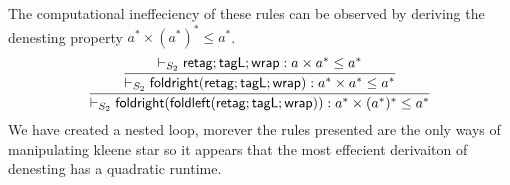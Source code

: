 \documentclass[a4paper,UKenglish,cleveref, autoref, thm-restate]{lipics-v2021}
\begin{document}
\begin{example}[Kozen]
The computational ineffeciency of these rules can be observed by deriving the denesting property $a ^* \times (a^*)^* \leq a^*$. 
\[\infer{\containsP{}{\dslcom{foldright}(\dslcom{foldleft}(\dslcom{retag};\dslcom{tagL};\dslcom{wrap}))}{a^* \times (a^*)^*}{a^*}{S_2}}{\infer{\containsP{}{\dslcom{foldright}(\dslcom{retag};\dslcom{tagL};\dslcom{wrap})}{a^* \times a^*}{a^*}{S_2}}{\containsP{}{\dslcom{retag};\dslcom{tagL};\dslcom{wrap}}{a \times a^*}{a^*}{S_2}}} \]
We have created a nested loop, morever the rules presented are the only ways of manipulating kleene star so it appears that the most effecient derivaiton of denesting has a quadratic runtime.
\end{example}
\end{document}
